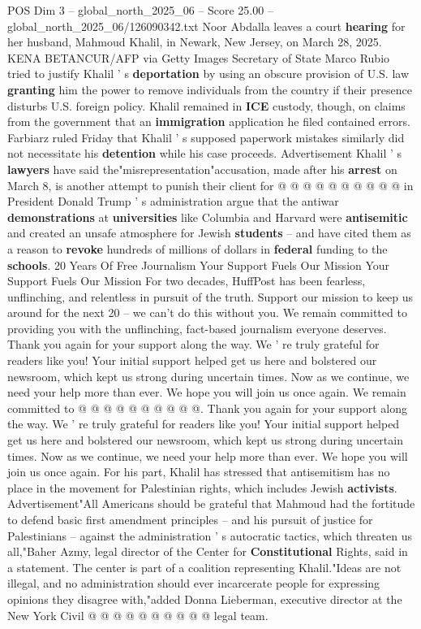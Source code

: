 \begin{textsample}{POS Dim 3 – global\_north\_2025\_06 – Score 25.00 – global\_north\_2025\_06/126090342.txt}
Noor Abdalla leaves a court \textbf{hearing} for her husband, Mahmoud Khalil, in Newark, New Jersey, on March 28, 2025.
KENA BETANCUR/AFP via Getty Images Secretary of State Marco Rubio tried to justify Khalil ' s \textbf{deportation} by using an obscure provision of U.S. law \textbf{granting} him the power to remove individuals from the country if their presence disturbs U.S. foreign policy.
Khalil remained in \textbf{ICE} custody, though, on claims from the government that an \textbf{immigration} application he filed contained errors.
Farbiarz ruled Friday that Khalil ' s supposed paperwork mistakes similarly did not necessitate his \textbf{detention} while his case proceeds.
Advertisement Khalil ' s \textbf{lawyers} have said the"misrepresentation"accusation, made after his \textbf{arrest} on March 8, is another attempt to punish their client for @ @ @ @ @ @ @ @ @ @ in President Donald Trump ' s administration argue that the antiwar \textbf{demonstrations} at \textbf{universities} like Columbia and Harvard were \textbf{antisemitic} and created an unsafe atmosphere for Jewish \textbf{students} -- and have cited them as a reason to \textbf{revoke} hundreds of millions of dollars in \textbf{federal} funding to the \textbf{schools}. 20 Years Of Free Journalism Your Support Fuels Our Mission Your Support Fuels Our Mission For two decades, HuffPost has been fearless, unflinching, and relentless in pursuit of the truth.
Support our mission to keep us around for the next 20 -- we can't do this without you.
We remain committed to providing you with the unflinching, fact-based journalism everyone deserves.
Thank you again for your support along the way.
We ' re truly grateful for readers like you!
Your initial support helped get us here and bolstered our newsroom, which kept us strong during uncertain times.
Now as we continue, we need your help more than ever.
We hope you will join us once again.
We remain committed to @ @ @ @ @ @ @ @ @ @.
Thank you again for your support along the way.
We ' re truly grateful for readers like you!
Your initial support helped get us here and bolstered our newsroom, which kept us strong during uncertain times.
Now as we continue, we need your help more than ever.
We hope you will join us once again.
For his part, Khalil has stressed that antisemitism has no place in the movement for Palestinian rights, which includes Jewish \textbf{activists}.
Advertisement"All Americans should be grateful that Mahmoud had the fortitude to defend basic first amendment principles -- and his pursuit of justice for Palestinians -- against the administration ' s autocratic tactics, which threaten us all,"Baher Azmy, legal director of the Center for \textbf{Constitutional} Rights, said in a statement.
The center is part of a coalition representing Khalil."Ideas are not illegal, and no administration should ever incarcerate people for expressing opinions they disagree with,"added Donna Lieberman, executive director at the New York Civil @ @ @ @ @ @ @ @ @ @ legal team.


\end{textsample}
